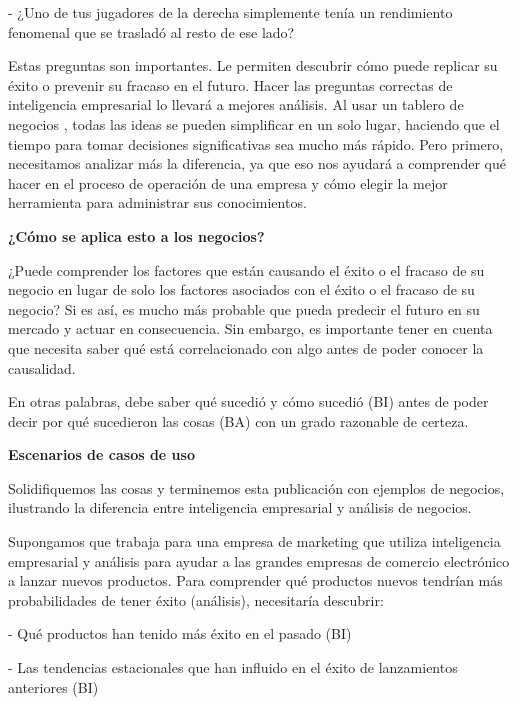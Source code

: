 \begin{flushleft}
\item 
- ¿Uno de tus jugadores de la derecha simplemente tenía un rendimiento fenomenal que se trasladó al resto de ese lado?
\item 
\item 
Estas preguntas son importantes. Le permiten descubrir cómo puede replicar su éxito o prevenir su fracaso en el futuro. Hacer las preguntas  correctas de inteligencia empresarial  lo llevará a mejores análisis. Al usar un tablero de negocios , todas las ideas se pueden simplificar en un solo lugar, haciendo que el tiempo para tomar decisiones significativas sea mucho más rápido. Pero primero, necesitamos analizar más la diferencia, ya que eso nos ayudará a comprender qué hacer en el proceso de operación de una empresa y cómo elegir la mejor herramienta para administrar sus conocimientos.
\item 
\textbf{¿Cómo se aplica esto a los negocios?}\\
\item 
¿Puede comprender los factores que están  causando  el éxito o el fracaso de su negocio en lugar de solo los factores  asociados  con el éxito o el fracaso de su negocio? Si es así, es mucho más probable que pueda predecir el futuro en su mercado y actuar en consecuencia. Sin embargo, es importante tener en cuenta que necesita saber qué está correlacionado con algo antes de poder conocer la causalidad.
\item
En otras palabras, debe saber  qué  sucedió y  cómo  sucedió (BI) antes de poder decir  por qué  sucedieron las cosas (BA) con un grado razonable de certeza.
\item
\item
\textbf{Escenarios de casos de uso}\\
\item
Solidifiquemos las cosas y terminemos esta publicación con ejemplos de negocios, ilustrando la diferencia entre inteligencia empresarial y análisis de negocios.
\item
Supongamos que trabaja para una empresa de marketing que utiliza inteligencia empresarial y análisis para ayudar a las grandes empresas de comercio electrónico a lanzar nuevos productos. Para comprender qué productos nuevos tendrían más probabilidades de tener éxito (análisis), necesitaría descubrir:
\item 
- Qué productos han tenido más éxito en el pasado (BI)
\item 
- Las tendencias estacionales que han influido en el éxito de lanzamientos anteriores (BI)

\end{flushleft}
